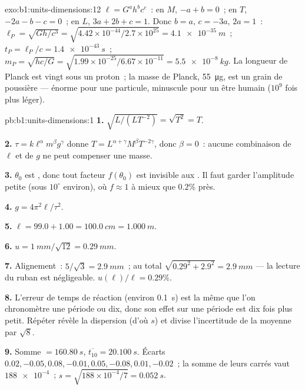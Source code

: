 \begin{solution}{exo:b1:units-dimensions:12}
$\ell = G^a h^b c^c$~: en $M$, $-a + b = 0$~; en $T$, $-2a - b - c = 0$~; en $L$,
$3a + 2b + c = 1$. Donc $b = a$, $c = -3a$, $2a = 1$~:
$\ell_P = \sqrt{Gh/c^3} = \sqrt{4.42\times10^{-44}/2.7\times10^{25}}
= \qty{4.1e-35}{m}$~; $t_P = \ell_P/c = \qty{1.4e-43}{s}$~;
$m_P = \sqrt{hc/G} = \sqrt{1.99\times10^{-25}/6.67\times10^{-11}}
= \qty{5.5e-8}{kg}$. La longueur de Planck est vingt 
sous un proton~; la masse de Planck, \qty{55}{\micro g}, est un grain de
poussière --- énorme pour une particule, minuscule pour un être humain
($10^9$ fois plus léger).
\end{solution}

\begin{solution}{pb:b1:units-dimensions:1}
\textbf{1.} $\sqrt{L/(L T^{-2})} = \sqrt{T^2} = T$.

\textbf{2.} $\tau = k\ell^\alpha m^\beta g^\gamma$ donne
$T = L^{\alpha+\gamma} M^\beta T^{-2\gamma}$, donc $\beta = 0$~: aucune
combinaison de $\ell$ et de $g$ ne peut compenser une masse.

\textbf{3.} $\theta_0$ est , donc tout facteur $f(\theta_0)$
est invisible aux . Il faut garder l'amplitude petite (sous
$10^\circ$ environ), où $f \approx 1$ à mieux que $0.2\%$ près.

\textbf{4.} $g = 4\pi^2\ell/\tau^2$.

\textbf{5.} $\ell = 99.0 + 1.00 = \qty{100.0}{cm} = \qty{1.000}{m}$.

\textbf{6.} $u = \qty{1}{mm}/\sqrt{12} = \qty{0.29}{mm}$.

\textbf{7.} Alignement~: $5/\sqrt3 = \qty{2.9}{mm}$~; au total
$\sqrt{0.29^2 + 2.9^2} = \qty{2.9}{mm}$ --- la lecture du ruban est
négligeable. $u(\ell)/\ell = 0.29\%$.

\textbf{8.} L'erreur de temps de réaction (environ \qty{0.1}{s}) est la
même que l'on chronomètre une période ou dix, donc son effet sur une
période est dix fois plus petit. Répéter révèle la dispersion (d'où $s$)
et divise l'incertitude de la moyenne par $\sqrt8$.

\textbf{9.} Somme $= \qty{160.80}{s}$, $\overline{t_{10}} = \qty{20.100}{s}$.
Écarts $0.02, -0.05, 0.08, -0.01, 0.05, -0.08, 0.01, -0.02$~; la somme de
leurs carrés vaut $\num{188e-4}$~; $s = \sqrt{188\times10^{-4}/7} = \qty{0.052}{s}$.


\end{solution}
